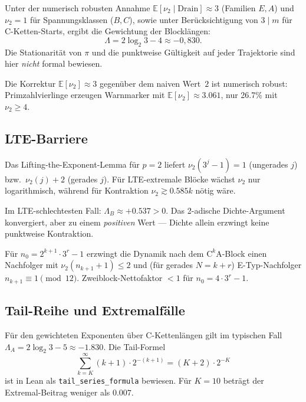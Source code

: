 \documentclass[12pt,a4paper]{article}
\newcommand{\vii}{\nu_2}
\newcommand{\Lam}{\Lambda}
\begin{document}
\begin{tcolorbox}[heuristik,title={Negativer mittlerer Drift}]
Unter der numerisch robusten Annahme $\mathbb{E}[\vii \mid \text{Drain}]
\approx 3$ (Familien $E,A$) und $\vii = 1$ für Spannungsklassen
($B,C$), sowie unter Berücksichtigung von $3 \mid m$ für C-Ketten-Starts,
ergibt die Gewichtung der Blocklängen:
\[
  \boxed{\Lam = 2\log_2 3 - 4 \approx -0{,}830.}
\]
Die Stationarität von $\pi$ und die punktweise Gültigkeit auf jeder
Trajektorie sind hier \emph{nicht} formal bewiesen.
\end{tcolorbox}

Die Korrektur $\mathbb{E}[\vii] \approx 3$ gegenüber dem naiven Wert~$2$
ist numerisch robust: Primzahlvierlinge erzeugen Warnmarker mit
$\mathbb{E}[\vii] \approx 3.061$, nur 26.7\% mit $\vii \geq 4$.

\subsection{LTE-Barriere}

Das Lifting-the-Exponent-Lemma für $p=2$ liefert
$\vii(3^j-1) = 1$ (ungerades $j$) bzw.\ $\vii(j)+2$ (gerades $j$).
Für LTE-extremale Blöcke wächst $\vii$ nur logarithmisch, während für
Kontraktion $\vii \gtrsim 0.585k$ nötig wäre.

\begin{tcolorbox}[offen,title={Szenario B: Dichte allein reicht nicht}]
Im LTE-schlechtesten Fall: $\Lambda_B \approx +0.537 > 0$.
Das 2-adische Dichte-Argument konvergiert, aber zu einem \emph{positiven}
Wert --- Dichte allein erzwingt keine punktweise Kontraktion.
\end{tcolorbox}

\begin{tcolorbox}[bewiesen,title={Strukturelle Kompensation}]
Für $n_0 = 2^{k+1}\cdot 3^r - 1$ erzwingt die Dynamik nach dem
$\mathrm{C}^k\mathrm{A}$-Block einen Nachfolger mit $\vii(n_{k+1}+1) \leq 2$
und (für gerades $N=k+r$) E-Typ-Nachfolger $n_{k+1} \equiv 1 \pmod{12}$.
Zweiblock-Nettofaktor $< 1$ für $n_0 = 4\cdot 3^r - 1$.
\end{tcolorbox}

\subsection{Tail-Reihe und Extremalfälle}

Für den gewichteten Exponenten über C-Kettenlängen gilt im typischen Fall
$\Lambda_A = 2\log_2 3 - 5 \approx -1.830$.
Die Tail-Formel
\[
  \sum_{k=K}^{\infty}(k+1)\cdot 2^{-(k+1)} = (K+2)\cdot 2^{-K}
\]
ist in Lean als \texttt{tail\_series\_formula} bewiesen.
Für $K=10$ beträgt der Extremal-Beitrag weniger als $0.007$.
\end{document}
